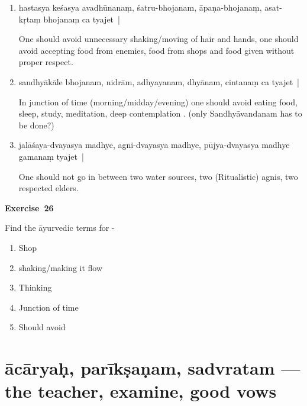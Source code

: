 \begin{enumerate}
\itemsep=0pt
\item {}

hastasya keśasya avadhūnanaṃ, śatru-bhoja\-nam, āpaṇa-bhoja\-naṃ, asat-kṛtaṃ bhojanaṃ ca  tyajet~| 

One should avoid unnecessary shaking/moving of hair and hands, one should avoid accepting food from enemies, food from shops and food given without proper respect. 

\item {}

sandhyākāle bhojanam, nidrām, adhyayanam, dhyānam, cinta\-naṃ ca tyajet~| 

In junction of time (morning/midday/evening) one should avoid eating food, sleep, study, meditation, deep contemplation . (only Sandhyāvandanam has to be done?) 

\item {}

jalāśaya-dvayasya madhye, agni-dvayasya madhye, pūjya-dvaya\-sya madhye gamanaṃ tyajet~|  

One should not go in between two water sources, two (Ritualistic) agnis, two respected elders.
\end{enumerate}

\centerline{\textbf{Exercise~26}}

Find the āyurvedic terms for -
\begin{enumerate}
\itemsep=0pt
\renewcommand{\theenumi}{\alph{enumi}}
\renewcommand{\labelenumi}{\theenumi.}
\item Shop
\item shaking/making it flow
\item Thinking
\item Junction of time  
\item Should avoid 
\end{enumerate}

\chapter{ācāryaḥ, parīkṣaṇam, sadvratam --- the teacher, examine, good vows}

